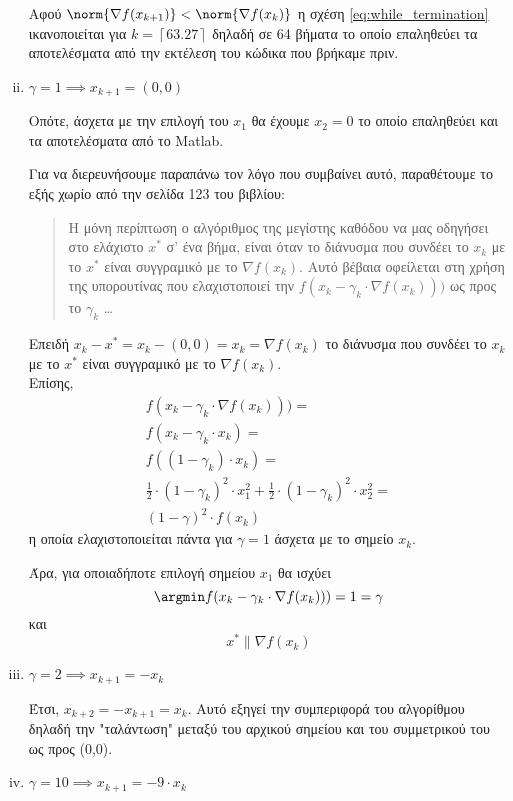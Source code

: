\begin{enumerate}[i)]
	Αφού $\norm{\nabla f(x_{k+1})} < \norm{\nabla f(x_k)}$ η σχέση \ref{eq:while_termination} ικανοποιείται για $k = \left \lceil{63.27}\right \rceil$
	δηλαδή σε 64 βήματα το οποίο επαληθεύει τα αποτελέσματα από την εκτέλεση του κώδικα που βρήκαμε πριν.
	
	\item $\gamma = 1 \implies x_{k+1} = (0,0)$
	
	Οπότε, άσχετα με την επιλογή του $x_1$ θα έχουμε $x_2 = 0$ το οποίο επαληθεύει και τα αποτελέσματα από το Matlab.
	
	Για να διερευνήσουμε παραπάνω τον λόγο που συμβαίνει αυτό, παραθέτουμε το εξής χωρίο από την σελίδα 123 του βιβλίου:
	\begin{quote}
		Η μόνη περίπτωση ο αλγόριθμος της μεγίστης καθόδου να μας οδηγήσει στο ελάχιστο $x^*$ σ' ένα βήμα, είναι όταν το διάνυσμα που συνδέει το $x_k$ με το $x^*$ είναι συγγραμικό με το $\nabla f(x_k)$. Αυτό βέβαια οφείλεται στη χρήση της υπορουτίνας που ελαχιστοποιεί την $f(x_k - \gamma_k \cdot \nabla f(x_k)))$ ως προς το $\gamma_k$ \ldots
	\end{quote}
	
	Επειδή $x_k - x^* = x_k - (0,0) = x_k = \nabla f(x_k)$ το διάνυσμα που συνδέει το $x_k$ με το $x^*$ είναι συγγραμικό με το $\nabla f(x_k)$.\\
	
	Επίσης,
	\begin{gather*}
		f(x_k - \gamma_k \cdot \nabla f(x_k))) =\\
		f(x_k - \gamma_k \cdot x_k)	=\\
		f((1-\gamma_k) \cdot x_k) =\\
		\frac{1}{2} \cdot (1 - \gamma_k)^2 \cdot x_1^2 + \frac{1}{2} \cdot (1 - \gamma_k)^2 \cdot x_2^2 =\\
		(1 - \gamma)^2 \cdot f(x_k)
	\end{gather*}
	η οποία ελαχιστοποιείται πάντα για $\gamma = 1$ άσχετα με το σημείο $x_k$.

	Άρα, για οποιαδήποτε επιλογή σημείου $x_1$ θα ισχύει 
	\[\argmin f(x_k - \gamma_k \cdot \nabla f(x_k))) = 1 = \gamma\]
	και
	\[x^* \parallel \nabla f(x_k)\]
	
 	\item $\gamma = 2 \implies x_{k+1} = -x_{k}$
 	
 	Έτσι, $x_{k+2}=-x_{k+1}=x_{k}$. 
 	Αυτό εξηγεί την συμπεριφορά του αλγορίθμου δηλαδή την "ταλάντωση" μεταξύ του αρχικού σημείου και του συμμετρικού του ως προς (0,0).
 	\item $\gamma = 10  \implies x_{k+1} = -9 \cdot x_k$
 		

\end{enumerate}
